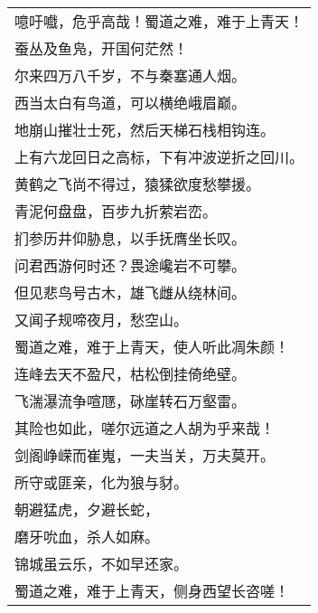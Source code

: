 \nopagebreak%
\nopagebreak%
\noindent\begin{minipage}{\linewidth}
  \vskip-3pt\begin{table}[H]
    \centering
    \begin{tabular}{@{}l@{}}
噫吁嚱，危乎高哉！蜀道之难，难于上青天！\\
蚕丛及鱼凫，开国何茫然！\\
尔来四万八千岁，不与秦塞通人烟。\\
西当太白有鸟道，可以横绝峨眉巅。\\
地崩山摧壮士死，然后天梯石栈相钩连。\\
上有六龙回日之高标，下有冲波逆折之回川。\\
黄鹤之飞尚不得过，猿猱欲度愁攀援。\\
青泥何盘盘，百步九折萦岩峦。\\
扪参历井仰胁息，以手抚膺坐长叹。\\
问君西游何时还？畏途巉岩不可攀。\\
但见悲鸟号古木，雄飞雌从绕林间。\\
又闻子规啼夜月，愁空山。\\
蜀道之难，难于上青天，使人听此凋朱颜！\\
连峰去天不盈尺，枯松倒挂倚绝壁。\\
飞湍瀑流争喧豗，砯崖转石万壑雷。\\
其险也如此，嗟尔远道之人胡为乎来哉！\\
剑阁峥嵘而崔嵬，一夫当关，万夫莫开。\\
所守或匪亲，化为狼与豺。\\
朝避猛虎，夕避长蛇，\\
磨牙吮血，杀人如麻。\\
锦城虽云乐，不如早还家。\\
蜀道之难，难于上青天，侧身西望长咨嗟！
    \end{tabular}
  \end{table}
\end{minipage}
\vspace{1cm}


